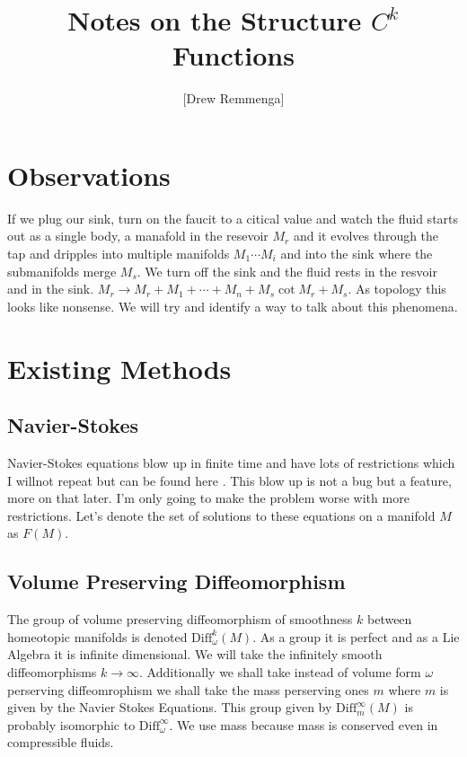 \documentclass[10pt, oneside]{article}
\title{Notes on the Structure $C^k$ Functions}
\author{[Drew Remmenga]}
\begin{document}
\maketitle
\begin{abstract}
\end{abstract}
\section*{Observations}
    If we plug our sink, turn on the faucit to a citical value and watch the fluid starts out as a single body, a manafold in the resevoir $M_r$ and it evolves through the tap and dripples into multiple manifolds $M_1 \cdots M_i$ and into the sink where the submanifolds merge $M_s$.
    We turn off the sink and the fluid rests in the resvoir and in the sink. $M_r \to M_r + M_1 + \cdots + M_n + M_s \cot M_r + M_s$. As topology this looks like nonsense. We will try and identify a way to talk about this phenomena.
\section*{Existing Methods}
\subsection*{Navier-Stokes}
    Navier-Stokes equations blow up in finite time \cite{tao2015finitetimeblowupaveraged} and have lots of restrictions which I willnot repeat but can be found here \cite{tao2015finitetimeblowupaveraged}. This blow up is not a bug but a feature, more on that later.
    I'm only going to make the problem worse with more restrictions. Let's denote the set of solutions to these equations on a manifold $M$ as $F(M)$.
\subsection*{Volume Preserving Diffeomorphism}
    The group of volume preserving diffeomorphism of smoothness $k$ between homeotopic manifolds is denoted $\text{Diff}^k_\omega(M)$. As a group it is perfect \cite{} and as a Lie Algebra it is infinite dimensional. We will take the infinitely smooth diffeomorphisms $k \to \infty$. 
    Additionally we shall take instead of volume form $\omega$ perserving diffeomrophism we shall take the mass perserving ones $m$ where $m$ is given by the Navier Stokes Equations. This group given by $\text{Diff}^\infty_m(M)$ is probably isomorphic to $\text{Diff}^\infty_\omega$.
    We use mass because mass is conserved even in compressible fluids.
\end{document}
